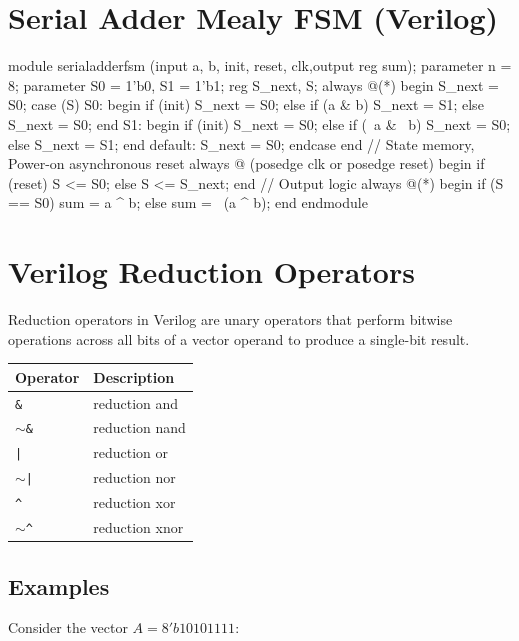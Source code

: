 \documentclass[12pt,openany]{book}
\begin{document}
\section{Serial Adder Mealy FSM (Verilog)}
\begin{minipage}[htp]{1\textwidth}
\begin{vhdl}
module serialadderfsm (input a, b, init, reset, clk,output reg sum);
	parameter n = 8;
	parameter S0 = 1'b0, S1 = 1'b1;
	reg S_next, S;
	always @(*) begin
		S_next = S0;
		case (S)
		S0: begin
			if (init) S_next = S0;
			else if (a & b) S_next = S1;
			else S_next = S0;
		end
		S1: begin
			if (init) S_next = S0;
			else if (~a & ~b) S_next = S0;
			else S_next = S1;
		end
		default: S_next = S0;
	endcase
	end	
	// State memory, Power-on asynchronous reset
	always @ (posedge clk or posedge reset) begin
		if (reset) S <= S0;
		else S <= S_next;
	end
	// Output logic
	always @(*) begin
		if (S == S0) sum = a ^ b;
		else sum = ~(a ^ b);
	end
endmodule
\end{vhdl}
\end{minipage}


\section{Verilog Reduction Operators}

Reduction operators in Verilog are unary operators that perform bitwise operations across all bits of a vector operand to produce a single-bit result.




\begin{center}
	\begin{tabular}{|l|l|}

		\hline	
		Operator & Description \\
		\hline	
		\texttt{\&} & reduction and \\		\hline	
		\texttt{$\sim$\&} & reduction nand \\		\hline	
		\texttt{|} & reduction or \\		\hline	
		\texttt{$\sim$|} & reduction nor \\		\hline	
		\texttt{\^} & reduction xor \\		\hline	
		\texttt{$\sim$\^} & reduction xnor \\		\hline	
		\end{tabular}
	\end{center}
		


\subsection*{Examples}
Consider the vector \( A = 8'b10101111 \):
\end{document}
